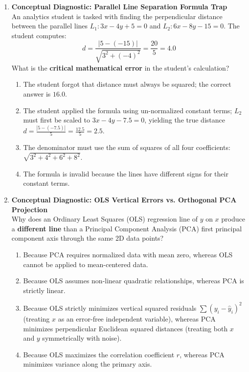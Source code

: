 \begin{enumerate}[resume]
\item \textbf{Conceptual Diagnostic: Parallel Line Separation Formula Trap} \\
An analytics student is tasked with finding the perpendicular distance between the parallel lines $L_1: 3x - 4y + 5 = 0$ and $L_2: 6x - 8y - 15 = 0$. The student computes:
$$d = \frac{|5 - (-15)|}{\sqrt{3^2 + (-4)^2}} = \frac{20}{5} = 4.0$$
What is the \textbf{critical mathematical error} in the student's calculation?
\begin{enumerate}
    \item The student forgot that distance must always be squared; the correct answer is $16.0$.
    \item The student applied the formula using un-normalized constant terms; $L_2$ must first be scaled to $3x - 4y - 7.5 = 0$, yielding the true distance $d = \frac{|5 - (-7.5)|}{5} = \frac{12.5}{5} = 2.5$.
    \item The denominator must use the sum of squares of all four coefficients: $\sqrt{3^2 + 4^2 + 6^2 + 8^2}$.
    \item The formula is invalid because the lines have different signs for their constant terms.
\end{enumerate}

\item \textbf{Conceptual Diagnostic: OLS Vertical Errors vs. Orthogonal PCA Projection} \\
Why does an Ordinary Least Squares (OLS) regression line of $y$ on $x$ produce a \textbf{different line} than a Principal Component Analysis (PCA) first principal component axis through the same 2D data points?
\begin{enumerate}
    \item Because PCA requires normalized data with mean zero, whereas OLS cannot be applied to mean-centered data.
    \item Because OLS assumes non-linear quadratic relationships, whereas PCA is strictly linear.
    \item Because OLS strictly minimizes vertical squared residuals $\sum (y_i - \hat{y}_i)^2$ (treating $x$ as an error-free independent variable), whereas PCA minimizes perpendicular Euclidean squared distances (treating both $x$ and $y$ symmetrically with noise).
    \item Because OLS maximizes the correlation coefficient $r$, whereas PCA minimizes variance along the primary axis.
\end{enumerate}
\end{enumerate}